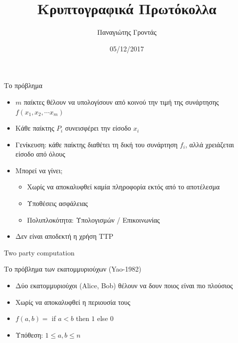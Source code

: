 \documentclass{beamer}
\title{Κρυπτογραφικά Πρωτόκολλα}
\author{Παναγιώτης Γροντάς}
\date{05/12/2017}
\institute{ΕΜΠ - Κρυπτογραφία - (2017-2018)}
\begin{document}
\newcommand{\xor}{ \oplus }
\newcommand{\msg}{ \mathtt{M} }
\newcommand{\KEY}{ \mathtt{K} }
\newcommand{\CPH}{ \mathtt{C} }
\newcommand{\keygen}{\mathtt{KeyGen}}
\newcommand{\enc}{\mathtt{Encrypt}}
\newcommand{\dec}{\mathtt{Decrypt}}
\newcommand{\sign}{\mathtt{Sign}}
\newcommand{\verify}{\mathtt{Verify}}
\newcommand{\adv}{$\mathcal{A}$ }
\newcommand{\Hash}{\mathcal{H} }
\newcommand{\advb}{$\mathcal{B}$ }
\newcommand{\chal}{$\mathcal{C}$ }
\newcommand{\cs}{$\mathcal{CS}$}
\newcommand{\Zed}{\mathbb{Z}} 
\newcommand{\zns}{\mathbb{Z}^*_n}
\newcommand{\zs}[1]{\mathbb{Z}^*_{#1}}

\newcommand{\green}[1]{\textcolor{teal}{#1}}
\newcommand{\Green}[1]{\textcolor{Teal}{#1}}
\newcommand{\ForestGreen}[1]{\textcolor{ForestGreen}{#1}}
\newcommand{\blue}[1]{\textcolor{blue}{#1}}
\newcommand{\magenta}[1]{\textcolor{magenta}{#1}}
\newcommand{\cyan}[1]{\textcolor{cyan}{#1}}

\newcommand{\twopartdef}[4]
{ 
		\begin{cases}
			#1 , #2 \\
			#3 , #4
		\end{cases} 
}

\begin{frame}
	\titlepage
\end{frame}
	
 

 
\begin{frame}{Το πρόβλημα}
	\begin{itemize}
		\item $m$ παίκτες θέλουν να υπολογίσουν από κοινού την τιμή της συνάρτησης $f(x_1, x_2, \cdots x_m)$
		\item Κάθε παίκτης $P_i$ συνεισφέρει την είσοδο $x_i$
		\item Γενίκευση: κάθε παίκτης διαθέτει τη δική του συνάρτηση $f_i$, αλλά χρειάζεται είσοδο από όλους
		\item Μπορεί να γίνει;
		\begin{itemize}
			\item Χωρίς να αποκαλυφθεί καμία πληροφορία εκτός από το αποτέλεσμα
			\item Υποθέσεις ασφάλειας
			\item Πολυπλοκότητα: Υπολογισμών / Επικοινωνίας
		\end{itemize}
		\item Δεν είναι αποδεκτή η χρήση TTP
	\end{itemize}
\end{frame}
  
\begin{frame}{Two party computation}
	\begin{block}{Το πρόβλημα των εκατομμυριούχων (Yao-1982)}
	\begin{itemize}
		\item Δύο εκατομμυριούχοι (Alice, Bob) θέλουν να δουν ποιος είναι πιο πλούσιος
		\item Χωρίς να αποκαλυφθεί	η περιουσία τους
		\item $f(a,b) = $ if $a<b$ then $1$ else $0$
		\item Υπόθεση: $1 \leq a,b \leq n$
	\end{itemize}
	\end{block}
\end{frame}
\end{document}
